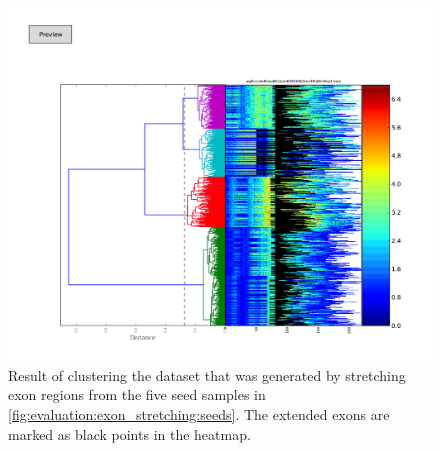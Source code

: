 \documentclass[parskip]{cs4rep}
\begin{document}
\begin{figure}[t,b]
   \centering
   \includegraphics[width=\textwidth]{figures/evaluation/exon_stretching/dgw_cut.pdf}
   \caption{Result of clustering the dataset that was generated by stretching exon regions from the five seed samples in \autoref{fig:evaluation:exon_stretching:seeds}. The extended exons are marked as black points in the heatmap.}
   \label{fig:evaluation:exon_stretching:cut}
\end{figure}
\end{document}
